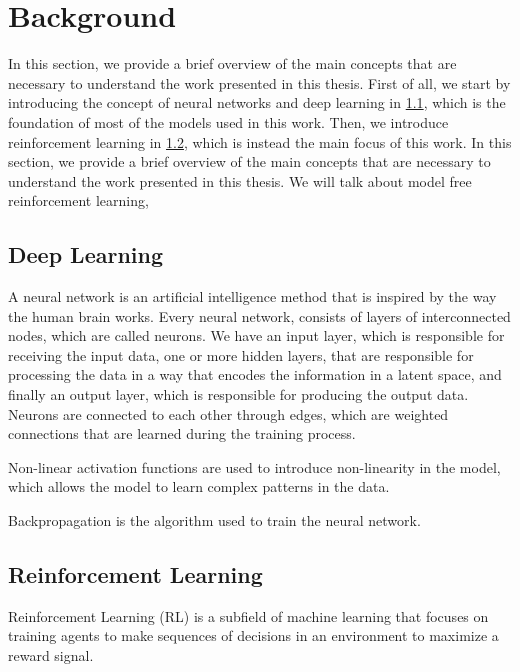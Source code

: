 
\section{Background}
\label{sec:background}
In this section, we provide a brief overview of the main concepts that are necessary to understand the work presented in this thesis.
First of all, we start by introducing the concept of neural networks and deep learning in \ref{sec:dl}, which is the foundation of most of the models used in this work.
Then, we introduce reinforcement learning in \ref{sec:rl}, which is instead the main focus of this work.
In this section, we provide a brief overview of the main concepts that are necessary to understand the work presented in this thesis. We will talk about model free reinforcement learning,

\subsection{Deep Learning}
\label{sec:dl}
A neural network is an artificial intelligence method that is inspired by the way the human brain works.
Every neural network, consists of layers of interconnected nodes, which are called neurons.
We have an input layer, which is responsible for receiving the input data, one or more hidden layers, that are responsible for processing the data in a way that encodes the information in a latent space, and finally an output layer, which is responsible for producing the output data.
Neurons are connected to each other through edges, which are weighted connections that are learned during the training process.

Non-linear activation functions are used to introduce non-linearity in the model, which allows the model to learn complex patterns in the data.

Backpropagation is the algorithm used to train the neural network.

%
%

\subsection{Reinforcement Learning}
\label{sec:rl}
Reinforcement Learning (RL) is a subfield of machine learning that focuses on training agents to make sequences of decisions in an environment to maximize a reward signal.

